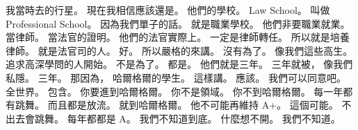 \hypertarget{c01:cue:2714}{}我當時去的行星。
\hypertarget{c01:cue:2715}{}現在我相信應該還是。
\hypertarget{c01:cue:2716}{}他們的學校。
\hypertarget{c01:cue:2717}{}Law School。
\hypertarget{c01:cue:2718}{}叫做 Professional School。
\hypertarget{c01:cue:2719}{}因為我們單子的話。
\hypertarget{c01:cue:2720}{}就是職業學校。
\hypertarget{c01:cue:2721}{}他們非要職業就業。
\hypertarget{c01:cue:2722}{}當律師。
\hypertarget{c01:cue:2723}{}當法官的證明。
\hypertarget{c01:cue:2724}{}他們的法官實際上。
\hypertarget{c01:cue:2725}{}一定是律師轉任。
\hypertarget{c01:cue:2726}{}所以就是培養律師。
\hypertarget{c01:cue:2727}{}就是法官司的人。
\hypertarget{c01:cue:2728}{}好。
\hypertarget{c01:cue:2729}{}所以嚴格的來講。
\hypertarget{c01:cue:2730}{}沒有為了。
\hypertarget{c01:cue:2731}{}像我們這些高生。
\hypertarget{c01:cue:2732}{}追求高深學問的人開始。
\hypertarget{c01:cue:2733}{}不是為了。
\hypertarget{c01:cue:2734}{}都是。
\hypertarget{c01:cue:2735}{}他們就是三年。
\hypertarget{c01:cue:2736}{}三年就被，
\hypertarget{c01:cue:2737}{}像我們私隱。
\hypertarget{c01:cue:2738}{}三年。
\hypertarget{c01:cue:2739}{}那因為，
\hypertarget{c01:cue:2740}{}哈爾格爾的學生。
\hypertarget{c01:cue:2741}{}這樣講。
\hypertarget{c01:cue:2742}{}應該。
\hypertarget{c01:cue:2743}{}我們可以同意吧。
\hypertarget{c01:cue:2744}{}全世界。
\hypertarget{c01:cue:2745}{}包含。
\hypertarget{c01:cue:2746}{}你要進到哈爾格爾。
\hypertarget{c01:cue:2747}{}你不是領域。
\hypertarget{c01:cue:2748}{}你不到哈爾格爾。
\hypertarget{c01:cue:2749}{}每一年都有跳舞。
\hypertarget{c01:cue:2750}{}而且都是放流。
\hypertarget{c01:cue:2751}{}就到哈爾格爾。
\hypertarget{c01:cue:2752}{}他不可能再維持 A+。
\hypertarget{c01:cue:2753}{}這個可能。
\hypertarget{c01:cue:2754}{}不出去會跳舞。
\hypertarget{c01:cue:2755}{}每年都都是 A。
\hypertarget{c01:cue:2756}{}我們不知道到底。
\hypertarget{c01:cue:2757}{}什麼想不開。
\hypertarget{c01:cue:2758}{}我們不知道。

